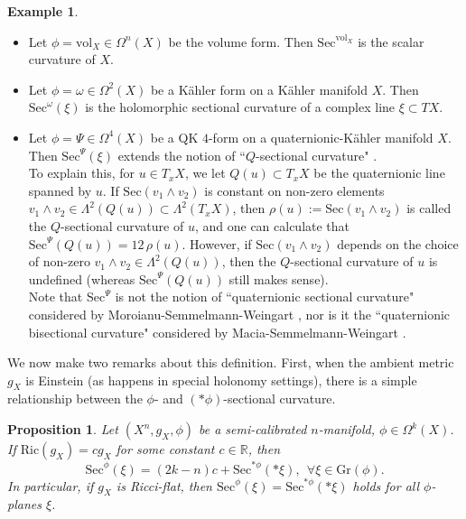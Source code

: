 \documentclass[11pt]{article}
\newcommand{\R}{\mathbb{R}}
\newcommand{\vol}{\mathrm{vol}}
\newtheorem{prop}[thm]{Proposition}
\theoremstyle{definition}
\newtheorem{example}[thm]{Example}
\numberwithin{equation}{section}
\begin{document}
\begin{example} \label{example:Sectional} ${}$
\begin{itemize}
\item Let $\phi = \vol_X \in \Omega^n(X)$ be the volume form.  Then $\mathrm{Sec}^{\vol_X}$ is the scalar curvature of $X$.
\item Let $\phi = \omega \in \Omega^2(X)$ be a K\"{a}hler form on a K\"{a}hler manifold $X$.  Then $\mathrm{Sec}^{\omega}(\xi)$ is the holomorphic sectional curvature of a complex line $\xi \subset TX$.
\item Let $\phi = \Psi \in \Omega^4(X)$ be a QK $4$-form on a quaternionic-K\"{a}hler manifold $X$.  Then $\mathrm{Sec}^\Psi(\xi)$ extends the notion of ``$Q$-sectional curvature" \cite{ishihara1973quaternion}. \\

To explain this, for $u \in T_xX$, we let $Q(u) \subset T_xX$ be the quaternionic line spanned by $u$.  If $\mathrm{Sec}(v_1 \wedge v_2)$ is constant on non-zero elements $v_1 \wedge v_2 \in \Lambda^2(Q(u)) \subset \Lambda^2(T_xX)$, then $\rho(u) := \mathrm{Sec}(v_1 \wedge v_2)$ is called the $Q$-sectional curvature of $u$, and one can calculate that $\mathrm{Sec}^\Psi(Q(u)) = 12\,\rho(u)$.  However, if $\mathrm{Sec}(v_1 \wedge v_2)$ depends on the choice of non-zero $v_1 \wedge v_2 \in \Lambda^2(Q(u))$, then the $Q$-sectional curvature of $u$ is undefined (whereas $\mathrm{Sec}^\Psi(Q(u))$ still makes sense). \\

Note that $\mathrm{Sec}^\Psi$ is not the notion of ``quaternionic sectional curvature" considered by Moroianu-Semmelmann-Weingart \cite{moroianu2024quaternion}, nor is it the ``quaternionic bisectional curvature" considered by Macia-Semmelmann-Weingart \cite{macia2025quaternionic}.
\end{itemize}
\end{example}

\indent We now make two remarks about this definition.  First, when the ambient metric $g_X$ is Einstein (as happens in special holonomy settings), there is a simple relationship between the $\phi$- and $(\ast \phi)$-sectional curvature.

\begin{prop} Let $(X^n, g_X, \phi)$ be a semi-calibrated $n$-manifold, $\phi \in \Omega^k(X)$.  If $\mathrm{Ric}(g_X) = c g_X$ for some constant $c \in \R$, then
$$\mathrm{Sec}^\phi(\xi) = (2k-n)c + \mathrm{Sec}^{\ast \phi}(\ast \xi), \ \ \forall \xi \in \mathrm{Gr}(\phi).$$
In particular, if $g_X$ is Ricci-flat, then $\mathrm{Sec}^\phi(\xi) = \mathrm{Sec}^{\ast \phi}(\ast \xi)$ holds for all $\phi$-planes $\xi$.
\end{prop}
\end{document}
